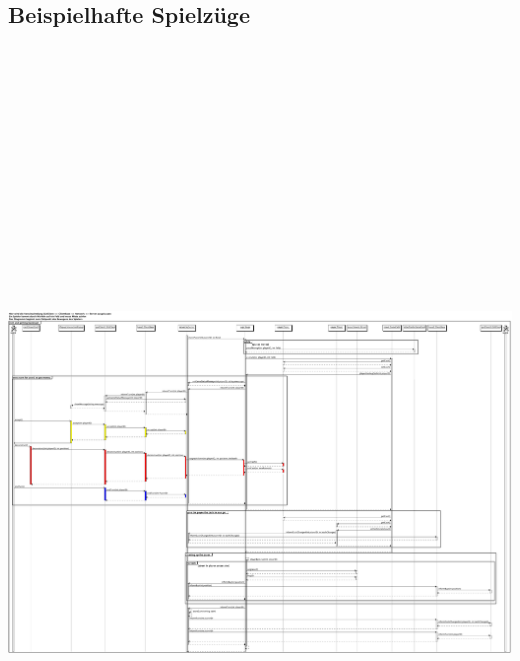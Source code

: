\documentclass[a4paper,10pt]{article}
\begin{document}
\subsection{Beispielhafte Spielzüge}
\includegraphics[angle = 90, height=23cm]{Sequenzdiagramme/bankrott_gehen}
\newpage
\end{document}
